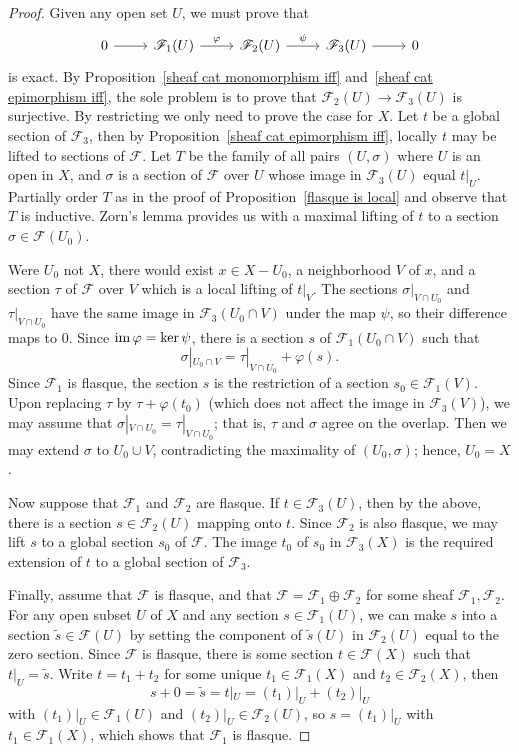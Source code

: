 \begin{proof}
Given any open set $U$, we must prove that
\[\begin{tikzcd}
0\ar[r]&\mathscr{F}_1(U)\ar[r,"\varphi"]&\mathscr{F}_2(U)\ar[r,"\psi"]&\mathscr{F}_3(U)\ar[r]&0
\end{tikzcd}\]
is exact. By Proposition~\ref{sheaf cat monomorphism iff} and~\ref{sheaf cat epimorphism iff}, the sole problem is to prove that $\mathscr{F}_2(U)\to\mathscr{F}_3(U)$ is surjective. By restricting we only need to prove the case for $X$. Let $t$ be a global section of $\mathscr{F}_3$, then by Proposition~\ref{sheaf cat epimorphism iff}, locally $t$ may be lifted to sections of $\mathscr{F}$. Let $T$ be the family of all pairs $(U,\sigma)$ where $U$ is an open in $X$, and $\sigma$ is a section of $\mathscr{F}$ over $U$ whose image in $\mathscr{F}_3(U)$ equal $t|_{U}$. Partially order $T$ as in the proof of Proposition~\ref{flasque is local} and observe that $T$ is inductive. Zorn's lemma provides us with a maximal lifting of $t$ to a section $\sigma\in\mathscr{F}(U_0)$.\par
Were $U_0$ not $X$, there would exist $x\in X-U_0$, a neighborhood $V$ of $x$, and a section $\tau$ of $\mathscr{F}$ over $V$ which is a local lifting of $t|_V$. The sections $\sigma|_{V\cap U_0}$ and $\tau|_{V\cap U_0}$ have the same image in $\mathscr{F}_3(U_0\cap V)$ under the map $\psi$, so their difference maps to $0$. Since $\operatorname{im}\varphi=\operatorname{ker}\psi$, there is a section $s$ of $\mathscr{F}_1(U_0\cap V)$ such that
\[\sigma|_{U_0\cap V}=\tau|_{V\cap U_0}+\varphi(s).\]
Since $\mathscr{F}_1$ is flasque, the section $s$ is the restriction of a section $s_0\in\mathscr{F}_1(V)$. Upon replacing $\tau$ by $\tau+\varphi(t_0)$ (which does not affect the image in $\mathscr{F}_3(V)$), we may assume that $\sigma|_{V\cap U_0}=\tau|_{V\cap U_0}$; that is, $\tau$ and $\sigma$ agree on the overlap. Then we may extend $\sigma$ to $U_0\cup V$, contradicting the maximality of $(U_0,\sigma)$; hence, $U_0=X$.\par
Now suppose that $\mathscr{F}_1$ and $\mathscr{F}_2$ are flasque. If $t\in\mathscr{F}_3(U)$, then by the above, there is a section $s\in\mathscr{F}_2(U)$ mapping onto $t$. Since $\mathscr{F}_2$ is also flasque, we may lift $s$ to a global section $s_0$ of $\mathscr{F}$. The image $t_0$ of $s_0$ in $\mathscr{F}_3(X)$ is the required extension of $t$ to a global section of $\mathscr{F}_3$.\par
Finally, assume that $\mathscr{F}$ is flasque, and that $\mathscr{F}=\mathscr{F}_1\oplus\mathscr{F}_2$ for some sheaf $\mathscr{F}_1,\mathscr{F}_2$. For any open subset $U$ of $X$ and any section $s\in\mathscr{F}_1(U)$, we can make $s$ into a section $\tilde{s}\in\mathscr{F}(U)$ by setting the component of $\tilde{s}(U)$ in $\mathscr{F}_2(U)$ equal to the zero section. Since $\mathscr{F}$ is flasque, there is some section $t\in\mathscr{F}(X)$ such that $t|_U=\tilde{s}$. Write $t=t_1+t_2$ for some unique $t_1\in\mathscr{F}_1(X)$ and $t_2\in\mathscr{F}_2(X)$, then
\[s+0=\tilde{s}=t|_U=(t_1)|_U+(t_2)|_U\]
with $(t_1)|_U\in\mathscr{F}_1(U)$ and $(t_2)|_U\in\mathscr{F}_2(U)$, so $s=(t_1)|_U$ with $t_1\in\mathscr{F}_1(X)$, which shows that $\mathscr{F}_1$ is flasque.
\end{proof}
